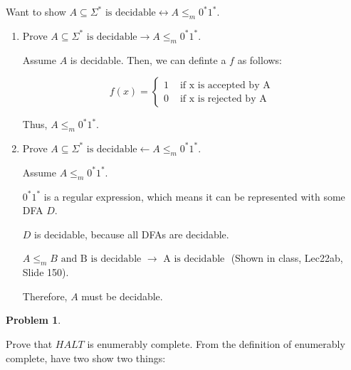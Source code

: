\documentclass[11pt]{article}
\theoremstyle{definition}
\theoremstyle{case}
\theoremstyle{theorem}
\newtheorem{prob}{Problem}
\begin{document}
Want to show $A \subseteq \Sigma^* \text{ is decidable} \leftrightarrow A \leq_m 0^*1^* $. 

\begin{enumerate}[label=(\alph*)]

\item

Prove $A \subseteq \Sigma^* \text { is decidable} \rightarrow A \leq_m 0^*1^*$.

Assume $A$ is decidable. Then, we can definte a $f$ as follows: 

\[ f(x) = \begin{cases} 
    
    1 & \text{ if x is accepted by A } \\

    0 & \text{ if x is rejected by A }    

    \end{cases}
\]

Thus, $A \leq_m 0^*1^*$.

\item

Prove $A \subseteq \Sigma^* \text { is decidable} \leftarrow A \leq_m 0^*1^*$.

Assume $A \leq_m 0^*1^*$. 

$0^*1^*$ is a regular expression, which means it can be represented with some DFA $D$. 

$D$ is decidable, because all DFAs are decidable.

$A \leq_m B \text{ and B is decidable } \rightarrow \text{ A is decidable }$ (Shown in class, Lec22ab, Slide 150).

Therefore, $A$ must be decidable.

\end{enumerate}

\newpage

\begin{prob}\end{prob}

Prove that $HALT$ is enumerably complete. From the definition of enumerably
complete, have two show two things:
\end{document}
